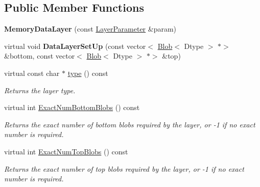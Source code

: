 \subsection*{Public Member Functions}
\begin{DoxyCompactItemize}
\item 
\mbox{\label{classcaffe_1_1_memory_data_layer_a9bf012786068bfe846694af129a6736f}} 
{\bfseries Memory\+Data\+Layer} (const \mbox{\hyperlink{classcaffe_1_1_layer_parameter}{Layer\+Parameter}} \&param)
\item 
\mbox{\label{classcaffe_1_1_memory_data_layer_aad493595bd8ac4cedba283c1850539b2}} 
virtual void {\bfseries Data\+Layer\+Set\+Up} (const vector$<$ \mbox{\hyperlink{classcaffe_1_1_blob}{Blob}}$<$ Dtype $>$ $\ast$$>$ \&bottom, const vector$<$ \mbox{\hyperlink{classcaffe_1_1_blob}{Blob}}$<$ Dtype $>$ $\ast$$>$ \&top)
\item 
\mbox{\label{classcaffe_1_1_memory_data_layer_a374835f9df814ef78e3f4a4d640f0d35}} 
virtual const char $\ast$ \mbox{\hyperlink{classcaffe_1_1_memory_data_layer_a374835f9df814ef78e3f4a4d640f0d35}{type}} () const
\begin{DoxyCompactList}\small\item\em Returns the layer type. \end{DoxyCompactList}\item 
virtual int \mbox{\hyperlink{classcaffe_1_1_memory_data_layer_a05a867526de7e0c6ec4851a97f52a47b}{Exact\+Num\+Bottom\+Blobs}} () const
\begin{DoxyCompactList}\small\item\em Returns the exact number of bottom blobs required by the layer, or -\/1 if no exact number is required. \end{DoxyCompactList}\item 
virtual int \mbox{\hyperlink{classcaffe_1_1_memory_data_layer_af714b4cbc022be1592ad26c300b63ae4}{Exact\+Num\+Top\+Blobs}} () const
\begin{DoxyCompactList}\small\item\em Returns the exact number of top blobs required by the layer, or -\/1 if no exact number is required. \end{DoxyCompactList}\item 
\mbox{\label{classcaffe_1_1_memory_data_layer_a5d7c633d066570d2b040ccabda9d9f60}} 

\end{DoxyCompactItemize}
